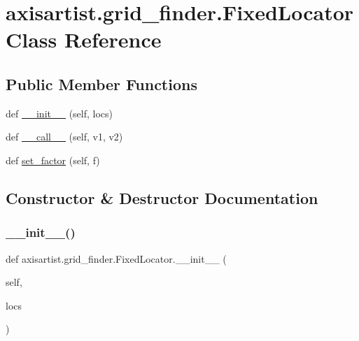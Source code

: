 \hypertarget{classaxisartist_1_1grid__finder_1_1FixedLocator}{}\section{axisartist.\+grid\+\_\+finder.\+Fixed\+Locator Class Reference}
\label{classaxisartist_1_1grid__finder_1_1FixedLocator}
\subsection*{Public Member Functions}
\begin{DoxyCompactItemize}
\item 
def \hyperlink{classaxisartist_1_1grid__finder_1_1FixedLocator_a3b971b6832e77d57556b9e65b748f63e}{\+\_\+\+\_\+init\+\_\+\+\_\+} (self, locs)
\item 
def \hyperlink{classaxisartist_1_1grid__finder_1_1FixedLocator_a58f26d36a0780b62f161855af46a9edd}{\+\_\+\+\_\+call\+\_\+\+\_\+} (self, v1, v2)
\item 
def \hyperlink{classaxisartist_1_1grid__finder_1_1FixedLocator_aedaa921e8889123956fe2caa2cd3d2fb}{set\+\_\+factor} (self, f)
\end{DoxyCompactItemize}


\subsection{Constructor \& Destructor Documentation}
\mbox{\label{classaxisartist_1_1grid__finder_1_1FixedLocator_a3b971b6832e77d57556b9e65b748f63e}} 
\subsubsection{\texorpdfstring{\+\_\+\+\_\+init\+\_\+\+\_\+()}{\_\_init\_\_()}}
{\footnotesize\ttfamily def axisartist.\+grid\+\_\+finder.\+Fixed\+Locator.\+\_\+\+\_\+init\+\_\+\+\_\+ (\begin{DoxyParamCaption}\item[{}]{self,  }\item[{}]{locs }\end{DoxyParamCaption})}



